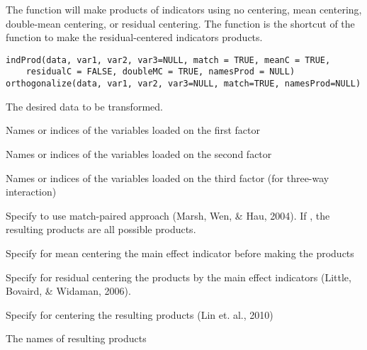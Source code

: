 \documentclass[a4paper]{book}
\begin{document}
%
\begin{Description}\relax
The  function will make products of indicators using no centering, mean centering, double-mean centering, or residual centering. The  function is the shortcut of the  function to make the residual-centered indicators products.
\end{Description}
%
\begin{Usage}
\begin{verbatim}
indProd(data, var1, var2, var3=NULL, match = TRUE, meanC = TRUE, 
	residualC = FALSE, doubleMC = TRUE, namesProd = NULL)
orthogonalize(data, var1, var2, var3=NULL, match=TRUE, namesProd=NULL)
\end{verbatim}
\end{Usage}
%
\begin{Arguments}
\begin{ldescription}
\item[\code{data}] 
The desired data to be transformed.

\item[\code{var1}] 
Names or indices of the variables loaded on the first factor

\item[\code{var2}] 
Names or indices of the variables loaded on the second factor

\item[\code{var3}] 
Names or indices of the variables loaded on the third factor (for three-way interaction)

\item[\code{match}] 
Specify  to use match-paired approach (Marsh, Wen, \& Hau, 2004). If , the resulting products are all possible products.

\item[\code{meanC}] 
Specify  for mean centering the main effect indicator before making the products

\item[\code{residualC}] 
Specify  for residual centering the products by the main effect indicators (Little, Bovaird, \& Widaman, 2006).

\item[\code{doubleMC}] 
Specify  for centering the resulting products (Lin et. al., 2010)

\item[\code{namesProd}] 
The names of resulting products

\end{ldescription}
\end{Arguments}
\end{document}
